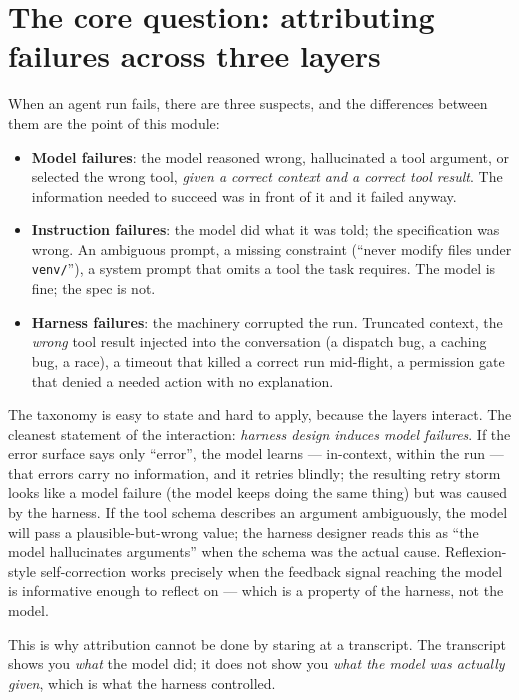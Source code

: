 \documentclass[11pt]{article}
\begin{document}
\section{The core question: attributing failures across three layers}
When an agent run fails, there are three suspects, and the differences between them are the point of this module:

\begin{itemize}[noitemsep]
  \item \textbf{Model failures}: the model reasoned wrong, hallucinated a tool argument, or selected the wrong tool, \emph{given a correct context and a correct tool result}. The information needed to succeed was in front of it and it failed anyway.
  \item \textbf{Instruction failures}: the model did what it was told; the specification was wrong. An ambiguous prompt, a missing constraint (``never modify files under \texttt{venv/}''), a system prompt that omits a tool the task requires. The model is fine; the spec is not.
  \item \textbf{Harness failures}: the machinery corrupted the run. Truncated context, the \emph{wrong} tool result injected into the conversation (a dispatch bug, a caching bug, a race), a timeout that killed a correct run mid-flight, a permission gate that denied a needed action with no explanation.
\end{itemize}

The taxonomy is easy to state and hard to apply, because the layers interact. The cleanest statement of the interaction: \emph{harness design induces model failures}. If the error surface says only ``error'', the model learns --- in-context, within the run --- that errors carry no information, and it retries blindly; the resulting retry storm looks like a model failure (the model keeps doing the same thing) but was caused by the harness. If the tool schema describes an argument ambiguously, the model will pass a plausible-but-wrong value; the harness designer reads this as ``the model hallucinates arguments'' when the schema was the actual cause. Reflexion-style self-correction \cite{shinn2023reflexion} works precisely when the feedback signal reaching the model is informative enough to reflect on --- which is a property of the harness, not the model.

This is why attribution cannot be done by staring at a transcript. The transcript shows you \emph{what} the model did; it does not show you \emph{what the model was actually given}, which is what the harness controlled.
\end{document}
